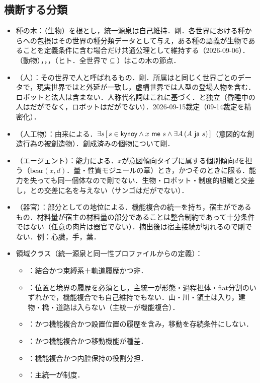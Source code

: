 \documentclass[../../main-detail.tex]{subfiles}
\begin{document}
\subsection{横断する分類}
\begin{itemize}
  \item 種の木：（生物）を根とし，統一源泉は自己維持．剛．各世界における種からへの包摂はその世界の種分類データとして与え，ある種の語義が生物であることを定義条件に含む場合だけ共通公理として維持する（2026-09-06）．（動物），，，（ヒト．全世界で$\subseteq$）はこの木の節点．
  \item {}（人）：その世界で人と呼ばれるもの．剛．所属はと同じく世界ごとのデータで，現実世界ではと外延が一致し，虚構世界では人型の登場人物を含む．ロボットと法人は含まない．人称代名詞はこれに基づく．と独立（昏睡中の人はだがでなく，ロボットはだがでない）．2026-09-15裁定（09-14裁定を精密化）．
  \item {}（人工物）：由来による．$\exists s\,[\,s\in\ko{kynoy}\land x\ \ko{me}\ s\land \exists A\,(A\ \ko{ja}\ s)\,]$（意図的な創造行為の被創造物）．創成済みの個物について剛．
  \item {}（エージェント）：能力による．$x$が意図傾向タイプに属する個別傾向$d$を担う（$\mathrm{bear}(x,d)$．量・性質モジュールの章）とき，かつそのときに限る．能力を失っても同一個体なので剛でない．生物・ロボット・制度的組織と交差し，との交差に名を与えない（サンゴはだがでない）．
  \item {}（器官）：部分としての地位による．機能複合の統一を持ち，宿主がであるもの．材料量が宿主の材料量の部分であることは整合制約であって十分条件ではない（任意の肉片は器官でない）．摘出後は宿主接続が切れるので剛でない．例：心臓，手，葉．
  \item 領域クラス（統一源泉と同一性プロファイルからの定義）：
    \begin{itemize}
      \item {}：結合かつ束縛系＋軌道履歴かつ非．
      \item {}：位置と境界の履歴を必須とし，主統一が形態・過程担体・fiat分割のいずれかで，機能複合でも自己維持でもない．山・川・領土は入り，建物・橋・道路は入らない（主統一が機能複合）．
      \item {}：かつ機能複合かつ設置位置の履歴を含み，移動を存続条件にしない．
      \item {}：かつ機能複合かつ移動機能が種差．
      \item {}：機能複合かつ内腔保持の役割分担．
      \item {}：主統一が制度．
    \end{itemize}
\end{itemize}
\end{document}
